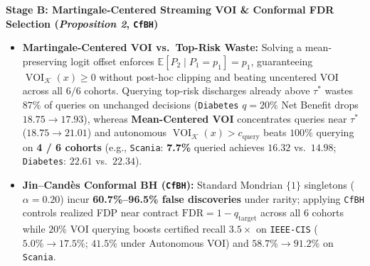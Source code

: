 \documentclass[11pt]{article}
\begin{document}
\textbf{Stage B: Martingale-Centered Streaming VOI \& Conformal FDR Selection (\emph{Proposition 2}, \texttt{CfBH})}
\begin{itemize}
  \item \textbf{Martingale-Centered VOI vs.\ Top-Risk Waste:} Solving a mean-preserving logit offset enforces $\mathbb{E}[P_2 \mid P_1 = p_1] = p_1$, guaranteeing $\operatorname{VOI}_{\mathcal{K}}(x) \ge 0$ without post-hoc clipping and beating uncentered VOI across all $6/6$ cohorts. Querying top-risk discharges already above $\tau^*$ wastes $87\%$ of queries on unchanged decisions (\texttt{Diabetes} $q=20\%$ Net Benefit drops $18.75 \to 17.93$), whereas \textbf{Mean-Centered VOI} concentrates queries near $\tau^*$ ($18.75 \to \mathbf{21.01}$) and autonomous $\operatorname{VOI}_{\mathcal{K}}(x) > c_{\text{query}}$ beats $100\%$ querying on \textbf{4 / 6 cohorts} (e.g., \texttt{Scania}: \textbf{7.7\%} queried achieves $\mathbf{16.32}$ vs.\ $14.98$; \texttt{Diabetes}: $\mathbf{22.61}$ vs.\ $22.34$).
  \item \textbf{Jin--Cand\`es Conformal BH (\texttt{CfBH}):} Standard Mondrian $\{1\}$ singletons ($\alpha=0.20$) incur \textbf{60.7\%--96.5\% false discoveries} under rarity; applying \texttt{CfBH} controls realized FDP near contract $\text{FDR} = 1 - q_{\text{target}}$ across all 6 cohorts while $20\%$ VOI querying boosts certified recall $3.5\times$ on \texttt{IEEE-CIS} ($5.0\% \to \mathbf{17.5\%}$; $\mathbf{41.5\%}$ under Autonomous VOI) and $58.7\% \to \mathbf{91.2\%}$ on \texttt{Scania}.
\end{itemize}
\end{document}
